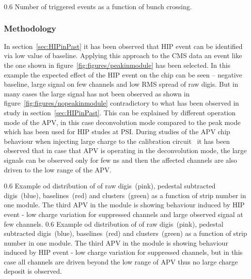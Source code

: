 
                 {0.6}       %
                 {Number of triggered events as a function of bunch crossing.} %


 \subsubsection{Methodology}
 

In section~\ref{sec:HIPinPast} it has been observed that HIP event can be identified via low value of baseline. Applying this approach to the CMS data an event like the one shown in figure~\ref{fig:figures/peakinmodule} has been selected. In this example the expected effect of the HIP event on the chip can be seen -- negative baseline, large signal on few channels and low RMS spread of raw digis. But in many cases the large signal has not been observed as shown in figure~\ref{fig:figures/nopeakinmodule} contradictory to what has been observed in study in section~\ref{sec:HIPinPast}. This can be explained by different operation mode of the APV, in this case deconvolution mode compared to the peak mode which has been used for HIP studes at PSI. During studies of the APV chip behaviour when injecting large charge to the calibration circuit~\cite{Bainbridge:2002bda} it has been observed that in case that APV is operating in the deconvolution mode, the large signals can be observed only for few ns and then the affected channels are also driven to the low range of the APV. 

                 {0.6}       %
                 {Example od distribution of of raw digis~(pink), pedestal subtracted digis~(blue), baselines~(red) and clusters~(green) as a function of strip number in one module. The third APV in the module is showing behaviour induced by HIP event - low charge variation for suppressed channels and large observed signal at few channels. } %
                 {0.6}       %
                 {Example od distribution of of raw digis~(pink), pedestal subtracted digis~(blue), baselines~(red) and clusters~(green) as a function of strip number in one module. The third APV in the module is showing behaviour induced by HIP event - low charge variation for suppressed channels, but in this case all channels are driven beyond the low range of APV thus no large charge deposit is observed. } %

